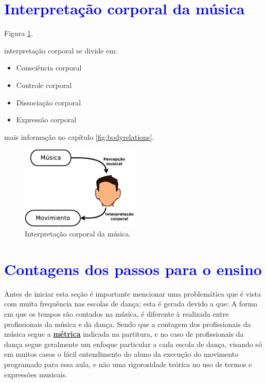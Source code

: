\section{\textcolor{blue}{Interpretação corporal da música}}

Figura \ref{fig:interpretacion-corporal}.

interpretação corporal se divide em:
\begin{itemize}
\item Consciência corporal
\item Controle corporal
\item Dissociação corporal
\item Expressão corporal
\end{itemize}
mais informação no capítulo \ref{fig:bodyrelations}.

\begin{figure}[!h]
  \centering
    \includegraphics[width=0.5\textwidth]{chapters/cap-musicalidade/interpretacion-corporal.eps}
\caption{Interpretação corporal da música.}
\label{fig:interpretacion-corporal}
\end{figure}



\section{\textcolor{blue}{Contagens dos passos para o ensino}}
Antes de iniciar esta seção é importante mencionar uma
problemática que é vista com muita frequência nas escolas de dança; 
esta é gerada devido a que: A forma em que os tempos são contados 
na música, é
diferente à realizada entre profissionais da música e da dança. 
Sendo que a contagem dos profissionais da música segue a \hyperref[def:Metrica]{\textbf{métrica}} indicada na partitura,
e no caso de profissionais da dança segue geralmente um enfoque 
particular a cada escola de dança, visando só em muitos casos o fácil entendimento do aluno da
execução do movimento programado para essa aula, e não uma rigorosidade teórica no uso de termos e 
expressões musicais.




